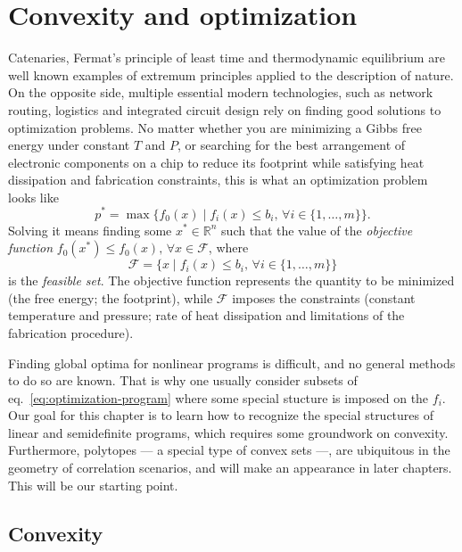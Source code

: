 \chapter{Convexity and optimization}
\thispagestyle{empty}  %

	Catenaries, Fermat's principle of least time and thermodynamic equilibrium are well known examples of extremum principles applied to the description of nature. On the opposite side, multiple essential modern technologies, such as network routing, logistics and integrated circuit design rely on finding good solutions to optimization problems. No matter whether you are minimizing a Gibbs free energy under constant $T$ and $P$, or searching for the best arrangement of electronic components on a chip to reduce its footprint while satisfying heat dissipation and fabrication constraints, this is what an optimization problem looks like
	\begin{equation}
		p^* = \max \big\{ f_0(x) \mid f_i(x) \leq b_i, \,\forall i \in \{1, \ldots, m\} \big\} .
		\label{eq:optimization-program}
	\end{equation}
	Solving it means finding some $x^* \in \mathbb{R}^n$ such that the value of the \emph{objective function} $f_0(x^*) \leq f_0(x), \,\forall x \in \mathcal{F}$, where
	$$
	\mathcal{F} = \big\{ x \mid f_i(x) \leq b_i , \,\forall i \in \{1, \ldots, m\} \big\}
	$$
	is the \emph{feasible set}. The objective function represents the quantity to be minimized (the free energy; the footprint), while $\mathcal{F}$ imposes the constraints (constant temperature and pressure; rate of heat dissipation and limitations of the fabrication procedure).
	
	Finding global optima for nonlinear programs is difficult, and no general methods to do so are known. That is why one usually consider subsets of eq.~\ref{eq:optimization-program} where some special stucture is imposed on the $f_i$. Our goal for this chapter is to learn how to recognize the special structures of linear and semidefinite programs, which requires some groundwork on convexity. Furthermore, polytopes --- a special type of convex sets ---, are ubiquitous in the geometry of correlation scenarios, and will make an appearance in later chapters. This will be our starting point.	


	\section{Convexity}
	\label{sec:convexity}

